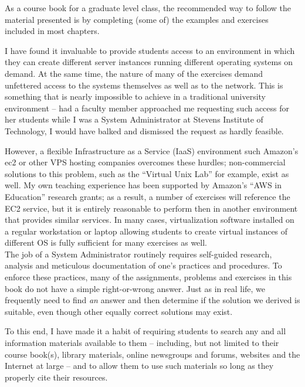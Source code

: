 As a course book for a graduate level class, the
recommended way to follow the material presented is by
completing (some of) the examples and exercises
included in most chapters.

I have found it invaluable to provide students access
to an environment in which they can create different
server instances running different operating systems
on demand.  At the same time, the nature of many of
the exercises demand unfettered access to the systems
themselves as well as to the network.  This is
something that is nearly impossible to achieve in a
traditional university environment -- had a faculty
member approached me requesting such access for her
students while I was a System Administrator at Stevens
Institute of Technology, I would have balked and
dismissed the request as hardly feasible.

However, a flexible Infrastructure as a
Service (IaaS)
environment such Amazon's \gls{ec2} or
other VPS hosting companies overcomes these hurdles;
non-commercial solutions to this problem, such as the
``Virtual Unix Lab''\cite{pre:feyrer-vul} for example,
exist as well.  My own teaching experience has been
supported by Amazon's ``AWS in Education'' research
grants\cite{pre:aws-grant}; as a result, a number of
exercises will reference the EC2 service, but it is
entirely reasonable to perform then in another
environment that provides similar services.  In many
cases, virtualization software installed on a
regular workstation or laptop allowing students to
create virtual instances of different OS is fully
sufficient for many exercises as well. \\

The job of a System Administrator routinely requires
self-guided research, analysis and meticulous
documentation of one's practices and procedures.  To
enforce these practices, many of the assignments,
problems and exercises in this book do not have a
simple right-or-wrong answer.  Just as in real life,
we frequently need to find {\em an} answer and then
determine if the solution we derived is suitable, even
though other equally correct solutions may exist.

To this end, I have made it a habit of requiring
students to search any and all information materials
available to them -- including, but not limited to
their course book(s), library materials, online
newsgroups and forums, websites and the Internet at
large -- and to allow them to use such materials so
long as they properly cite their resources.

